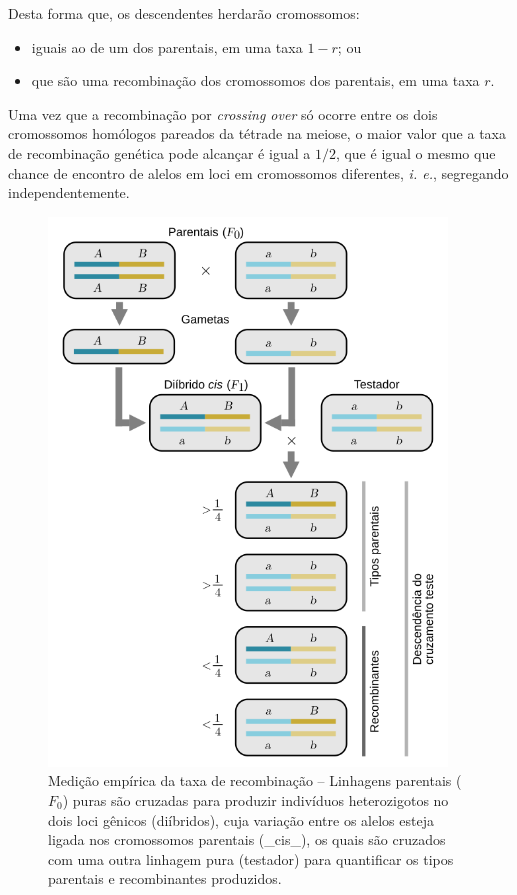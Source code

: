 \documentclass[
]{book}
\begin{document}
Desta forma que, os descendentes herdarão cromossomos:

\begin{itemize}
\item
  iguais ao de um dos parentais, em uma taxa \(1 − r\); ou
\item
  que são uma recombinação dos cromossomos dos parentais, em uma taxa \(r\).
\end{itemize}

Uma vez que a recombinação por \emph{crossing over} só ocorre entre os dois cromossomos homólogos pareados da tétrade na meiose, o maior valor que a taxa de recombinação genética pode alcançar é igual a \(1/2\), que é igual o mesmo que chance de encontro de alelos em loci em cromossomos diferentes, \emph{i. e.}, segregando independentemente.

\begin{figure}

{\centering \includegraphics[width=400px]{figs/recombination_tester} 

}

\caption{Medição empírica da taxa de recombinação -- Linhagens parentais ($F_0$) puras são cruzadas para produzir indivíduos heterozigotos no dois loci gênicos (diíbridos), cuja variação entre os alelos esteja ligada nos cromossomos parentais (_cis_), os quais são cruzados com uma outra linhagem pura (testador) para quantificar os tipos parentais e recombinantes produzidos.}\label{fig:tester}
\end{figure}
\end{document}
